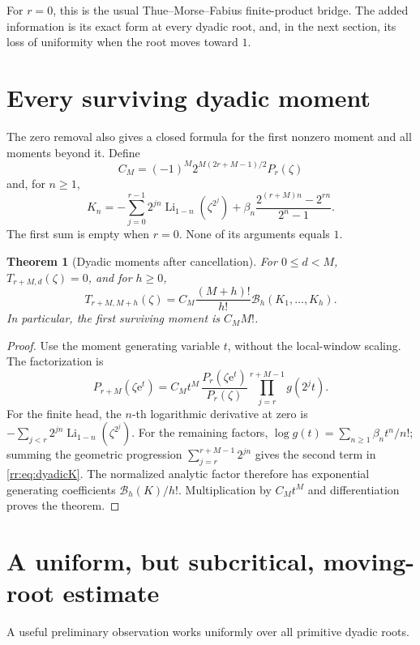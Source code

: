 \documentclass[11pt,a4paper,oneside,openany]{book}
\numberwithin{equation}{chapter}
\newtheorem{theorem}{Theorem}[chapter]
\theoremstyle{definition}
\theoremstyle{remark}
\newcommand{\e}{\mathrm e}
\DeclareMathOperator{\Li}{Li}
\newcommand{\B}{\mathcal B}
\begin{document}
For \(r=0\), this is the usual Thue--Morse--Fabius finite-product bridge. The added information is its exact form at every dyadic root, and, in the next section, its loss of uniformity when the root moves toward \(1\).

\section{Every surviving dyadic moment}
The zero removal also gives a closed formula for the first nonzero moment and all moments beyond it. Define
\begin{equation}
 C_M=(-1)^M2^{M(2r+M-1)/2}P_r(\zeta)
 \label{rr:eq:dyadicC}
\end{equation}
and, for \(n\geq1\),
\begin{equation}
 K_n=-\sum_{j=0}^{r-1}2^{jn}\Li_{1-n}(\zeta^{2^j})
       +\beta_n\frac{2^{(r+M)n}-2^{rn}}{2^n-1}.
 \label{rr:eq:dyadicK}
\end{equation}
The first sum is empty when \(r=0\). None of its arguments equals \(1\).

\begin{theorem}[Dyadic moments after cancellation]
For \(0\leq d<M\), \(T_{r+M,d}(\zeta)=0\), and for \(h\geq0\),
\begin{equation}
 T_{r+M,M+h}(\zeta)
 =C_M\frac{(M+h)!}{h!}\B_h(K_1,\ldots,K_h).
 \label{rr:eq:dyadicmoments}
\end{equation}
In particular, the first surviving moment is \(C_MM!\).
\end{theorem}
\begin{proof}
Use the moment generating variable \(t\), without the local-window scaling. The factorization is
\[
 P_{r+M}(\zeta\e^t)
 =C_Mt^M\,
 \frac{P_r(\zeta\e^t)}{P_r(\zeta)}
 \prod_{j=r}^{r+M-1}g(2^jt).
\]
For the finite head, the \(n\)-th logarithmic derivative at zero is
\(-\sum_{j<r}2^{jn}\Li_{1-n}(\zeta^{2^j})\).
For the remaining factors, \(\log g(t)=\sum_{n\geq1}\beta_nt^n/n!\); summing the geometric progression \(\sum_{j=r}^{r+M-1}2^{jn}\) gives the second term in \eqref{rr:eq:dyadicK}. The normalized analytic factor therefore has exponential generating coefficients \(\B_h(K)/h!\). Multiplication by \(C_Mt^M\) and differentiation proves the theorem.
\end{proof}

\section{A uniform, but subcritical, moving-root estimate}
A useful preliminary observation works uniformly over all primitive dyadic roots.
\end{document}
